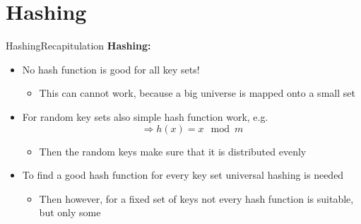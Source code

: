 
\section{Hashing}


\begin{frame}{Hashing}{Recapitulation}
  \textbf{Hashing:}
  \begin{itemize}   
  \item<2->
    No hash function is good for all key sets!\\
    \begin{itemize}
    \item<3->
      This can cannot work, because a big universe
      is mapped onto a small set 
    \end{itemize}
  \item<4->
    For random key sets also simple hash function work, e.g.
     {\color{Mittel-Blau}\[\Rightarrow h(x) = x \mod m\]}\vspace*{-2em}
     \begin{itemize}
    \item<5->
      Then the random keys make sure that it is distributed evenly
     \end{itemize}
  \item<6->
   To find a good hash function for every key set universal hashing is needed
     \begin{itemize}
    \item<7->
      Then however, for a fixed set of keys not every hash function is suitable,
      but only some
    \end{itemize}   
  \end{itemize}
\end{frame}


